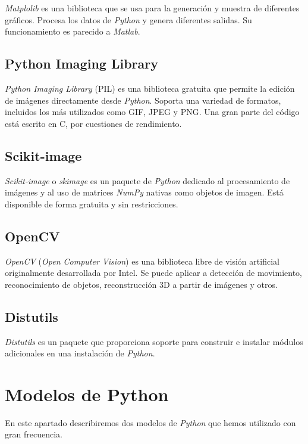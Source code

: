 \textit{Matplolib} \cite{TyH:matplotlib} es una biblioteca que se usa para la generación y muestra de diferentes gráficos. Procesa los datos de \textit{Python} y genera diferentes salidas. Su funcionamiento es parecido a \textit{Matlab}.

\subsection{Python Imaging Library}

\textit{Python Imaging Library} (PIL) \cite{TyH:PIL} es una biblioteca gratuita que permite la edición de imágenes directamente desde \textit{Python}. Soporta una variedad de formatos, incluidos los más utilizados como GIF, JPEG y PNG. Una gran parte del código está escrito en C, por cuestiones de rendimiento.

\subsection{Scikit-image}

\textit{Scikit-image} o \textit{skimage} \cite{TyH:skimage} es un paquete de \textit{Python} dedicado al procesamiento de imágenes y al uso de matrices \textit{NumPy} nativas como objetos de imagen. Está disponible de forma gratuita y sin restricciones.

\subsection{OpenCV}

\textit{OpenCV} (\textit{Open Computer Vision}) es una biblioteca libre de visión artificial originalmente desarrollada por Intel. Se puede aplicar a detección de movimiento, reconocimiento de objetos, reconstrucción 3D a partir de imágenes y otros.

\subsection{Distutils}

\textit{Distutils} \cite{TyH:distutils} es un paquete que proporciona soporte para construir e instalar módulos adicionales en una instalación de \textit{Python}.

\section{Modelos de Python}

En este apartado describiremos dos modelos de \textit{Python} que hemos utilizado con gran frecuencia.

